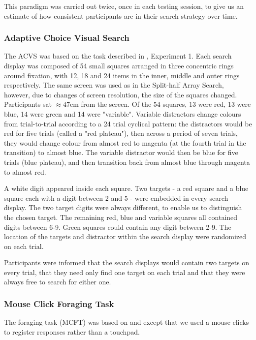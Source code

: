 \documentclass[]{rsos}%
\begin{document}
This paradigm was carried out twice, once in each testing session, to give us an estimate of how consistent participants are in their search strategy over time. 


\subsubsection{Adaptive Choice Visual Search}

The ACVS was based on the task described in \cite{irons-leber2016}, Experiment 1. Each search display was composed of 54 small squares arranged in three concentric rings around fixation, with 12, 18 and 24 items in the inner, middle and outer rings respectively. The same screen was used as in the Split-half Array Search, however, due to changes of screen resolution, the size of the squares changed. Participants sat $\approx 47$cm from the screen. Of the 54 squares, 13 were red, 13 were blue, 14 were green and 14 were "variable". Variable distractors change colours from trial-to-trial according to a 24 trial cyclical pattern: the distractors would be red for five trials (called a "red plateau"), then across a period of seven trials, they would change colour from almost red to magenta (at the fourth trial in the transition) to almost blue. The variable distractor would then be blue for five trials (blue plateau), and then transition back from almost blue through magenta to almost red. 

A white digit appeared inside each square. Two targets - a red square and a blue square each with a digit between 2 and 5 - were embedded in every search display. The two target digits were always different, to enable us to distinguish the chosen target. The remaining red, blue and variable squares all contained digits between 6-9. Green squares could contain any digit between 2-9. The location of the targets and distractor within the search display were randomized on each trial.

Participants were informed that the search displays would contain two targets on every trial, that they need only find one target on each trial and that they were always free to search for either one.   

\subsubsection{Mouse Click Foraging Task}

The foraging task (MCFT) was based on \cite{kristjansson2014} and \cite{johannesson2016} except that we used a mouse clicks to register responses rather than a touchpad. 
\end{document}
